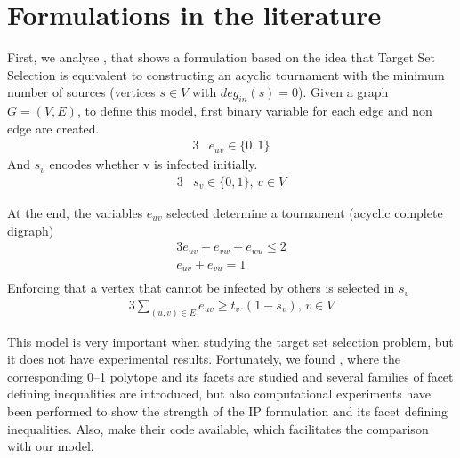 \section{Formulations in the literature}
First, we analyse \cite{Ackerman2010}, that shows a formulation based on the idea that Target Set Selection is equivalent to constructing an acyclic tournament with the minimum number of sources (vertices $s \in V$ with $deg_{in}(s) = 0$).
Given a graph $G=(V,E)$, to define this model, first binary variable for each edge and non edge are created. %
    \begin{alignat*}{3}
        & e_{uv} \in \{0,1\}%
    \end{alignat*}
    And $s_v$ encodes whether v is infected initially.
    \begin{alignat*}{3}
        & s_v \in \{0,1\}\textit{,   } v \in V 
    \end{alignat*}
    
    At the end, the variables $e_{uv}$ selected determine a tournament (acyclic complete digraph) 
    \begin{alignat*}{3}
        e_{uv} + e_{vw} + e_{wu} \leq 2  \\
        e_{uv} + e_{vu} = 1 \\
    \end{alignat*}
    Enforcing that a vertex that cannot be infected by others is selected in $s_v$
    \begin{alignat*}{3}
        \displaystyle\sum\limits_{(u, v) \in E} e_{uv} \geq t_v . (1 - s_v) \textit{,   } v \in V
    \end{alignat*}

This model is very important when studying the target set selection problem, but it does not have experimental results. Fortunately, we found \cite{Soltani2019}, where the corresponding 0–1 polytope and its facets are studied and several families of facet defining inequalities are introduced, but also computational experiments have been performed to show the strength of the IP formulation and its facet defining inequalities. Also, \citeauthor{Soltani2019} make their code available, which facilitates the comparison with our model.
